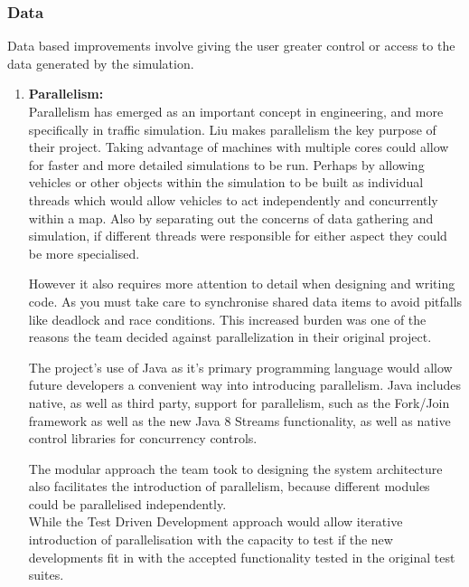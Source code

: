 \documentclass[11pt]{article}
\begin{document}
\begin{enumerate}
\subsubsection{Data}
Data based improvements involve giving the user greater control or access to the data generated by the simulation.\\

\begin{enumerate}
	
	\item \textbf{Parallelism:}
	\\
	
	Parallelism has emerged as an important concept in engineering, and more specifically in traffic simulation. Liu \cite{website:phy-ntnu-traffic-simulation} makes parallelism the key purpose of their project. Taking advantage of machines with multiple cores could allow for faster and more detailed simulations to be run. Perhaps by allowing vehicles or other objects within the simulation to be built as individual threads which would allow vehicles to act independently and concurrently within a map. Also by separating out the concerns of data gathering and simulation, if different threads were responsible for either aspect they could be more specialised.
	
	However it also requires more attention to detail when designing and writing code. As you must take care to synchronise shared data items to avoid pitfalls like deadlock and race conditions. This increased burden was one of the reasons the team decided against parallelization in their original project.
	
	The project's use of Java as it's primary programming language would allow future developers a convenient way into introducing parallelism. Java includes native, as well as third party, support for parallelism, such as the Fork/Join framework\cite{LeaForkJoin} as well as the new Java 8 Streams functionality\cite{website:Oracle-Java-8}, as well as native control libraries for concurrency controls.
	
	The modular approach the team took to designing the system architecture also facilitates the introduction of parallelism, because different modules could be parallelised independently.
	\\While the Test Driven Development approach would allow iterative introduction of parallelisation with the capacity to test if the new developments fit in with the accepted functionality tested in the original test suites.\\
	

\end{enumerate}
\end{enumerate}
\end{document}

